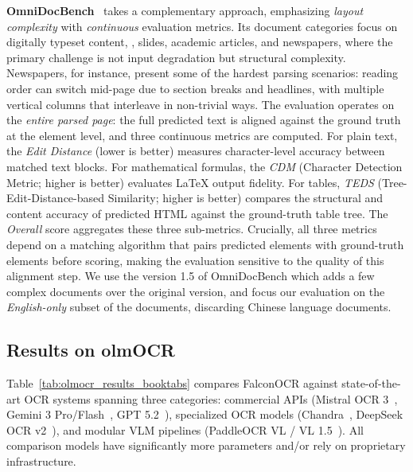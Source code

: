 \noindent \textbf{OmniDocBench}~\citep{ouyang2025omnidocbench} takes a complementary approach, emphasizing \textit{layout complexity} with \textit{continuous} evaluation metrics. Its document categories focus on digitally typeset content, \ie, slides, academic articles, and newspapers, where the primary challenge is not input degradation but structural complexity. Newspapers, for instance, present some of the hardest parsing scenarios: reading order can switch mid-page due to section breaks and headlines, with multiple vertical columns that interleave in non-trivial ways. The evaluation operates on the \textit{entire parsed page}: the full predicted text is aligned against the ground truth at the element level, and three continuous metrics are computed. For plain text, the \textit{Edit Distance} (lower is better) measures character-level accuracy between matched text blocks. For mathematical formulas, the \textit{CDM} (Character Detection Metric; higher is better) evaluates \LaTeX{} output fidelity. For tables, \textit{TEDS} (Tree-Edit-Distance-based Similarity; higher is better) compares the structural and content accuracy of predicted HTML against the ground-truth table tree. The \textit{Overall} score aggregates these three sub-metrics. Crucially, all three metrics depend on a matching algorithm that pairs predicted elements with ground-truth elements before scoring, making the evaluation sensitive to the quality of this alignment step.
We use the version 1.5 of OmniDocBench which adds a few complex documents over the original version, and focus our evaluation on the \textit{English-only} subset of the documents, discarding Chinese language documents.


\subsection{Results on olmOCR}

Table~\ref{tab:olmocr_results_booktabs} compares FalconOCR against state-of-the-art OCR systems spanning three categories: commercial APIs (Mistral OCR 3~\citep{mistral2025ocr}, Gemini 3 Pro/Flash~\citep{gemini_deepmind}, GPT 5.2~\citep{openai_gpt52}), specialized OCR models (Chandra~\citep{chandra2025}, DeepSeek OCR v2~\citep{wei2026deepseek}), and modular VLM pipelines (PaddleOCR VL \citep{cui2025paddleocrvl} / VL 1.5~\citep{cui2026paddleocrvl15}). All comparison models have significantly more parameters and/or rely on proprietary infrastructure.

